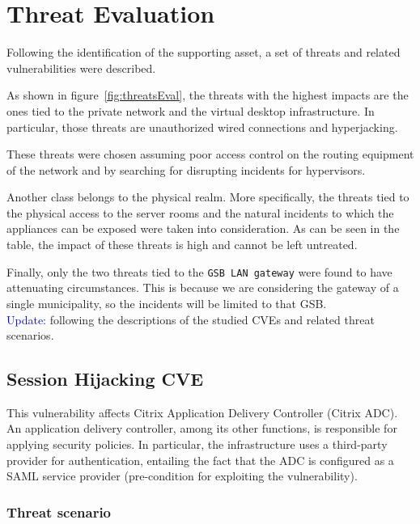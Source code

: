 \section*{Threat Evaluation}

Following the identification of the supporting asset, a set of threats and related vulnerabilities were described. 

As shown in figure~\ref{fig:threatsEval}, the threats with the highest impacts are the ones tied to the private network and the virtual desktop infrastructure. In particular, those threats are unauthorized wired connections and hyperjacking\cite{online:hyperjacking}.

These threats were chosen assuming poor access control on the routing equipment of the network and by searching for disrupting incidents for hypervisors. 

Another class belongs to the physical realm. More specifically, the threats tied to the physical access to the server rooms and the natural incidents to which the appliances can be exposed were taken into consideration. As can be seen in the table, the impact of these threats is high and cannot be left untreated.

Finally, only the two threats tied to the \texttt{GSB LAN gateway} were found to have attenuating circumstances. This is because we are considering the gateway of a single municipality, so the incidents will be limited to that GSB.\\

\noindent \textcolor{blue}{Update:} following the descriptions of the studied CVEs and related threat scenarios. 

\subsection*{Session Hijacking \- CVE}

This vulnerability affects Citrix Application Delivery Controller (Citrix ADC). An application delivery controller, among its other functions, is responsible for applying security policies. In particular, the infrastructure uses a third-party provider for authentication, entailing the fact that the ADC is configured as a SAML service provider (pre-condition for exploiting the vulnerability).

\subsubsection*{Threat scenario}

